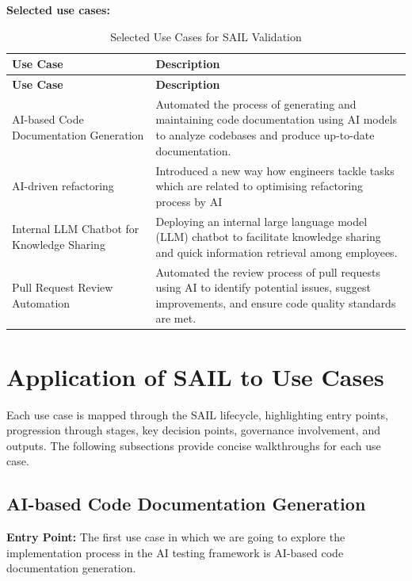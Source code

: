 \documentclass[]{imc-inf}
\begin{document}
\textbf{Selected use cases:}
\begin{longtable}{|p{0.36\linewidth}|p{0.64\linewidth}|}
	\hline
	\textbf{Use Case} & \textbf{Description} \\
	\hline
	\endfirsthead
	\hline
	\textbf{Use Case} & \textbf{Description} \\
	\hline
	\endhead
	\hline
	\caption{Selected Use Cases for SAIL Validation}
	\label{tab:selected_use_cases}
	\endlastfoot
	
	AI-based Code Documentation Generation &
	Automated the process of generating and maintaining code documentation using AI models to analyze codebases and produce up-to-date documentation. \\
	\hline
	
	AI-driven refactoring & 
	Introduced a new way how engineers tackle tasks which are related to optimising refactoring process by AI \\
	\hline
	
	Internal LLM Chatbot for Knowledge Sharing &
	Deploying an internal large language model (LLM) chatbot to facilitate knowledge sharing and quick information retrieval among employees. \\
	\hline
	
	Pull Request Review Automation &
	Automated the review process of pull requests using AI to identify potential issues, suggest improvements, and ensure code quality standards are met. \\
	\hline
	
\end{longtable}


\section{Application of SAIL to Use Cases}\label{application-of-sail-to-use-cases}

Each use case is mapped through the SAIL lifecycle, highlighting entry
points, progression through stages, key decision points, governance
involvement, and outputs. The following subsections provide concise
walkthroughs for each use case.

\subsection{AI-based Code Documentation Generation}\label{ai-based-code-documentation-generation}

\textbf{Entry Point:} The first use case in which we are going to explore the implementation process in the AI testing framework is AI-based code documentation generation.
\end{document}
